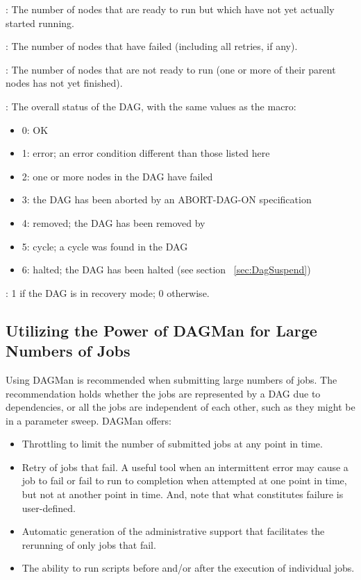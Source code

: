 :  The number of nodes that are ready to run but
which have not yet actually started running.

:  The number of nodes that have failed (including
all retries, if any).

:  The number of nodes that are not ready to run
(one or more of their parent nodes has not yet finished).

:  The overall status of the DAG, with the same values
as the  macro:
\begin{itemize}
\item 0: OK
\item 1: error; an error condition different than those listed here
\item 2: one or more nodes in the DAG have failed
\item 3: the DAG has been aborted by an ABORT-DAG-ON specification
\item 4: removed; the DAG has been removed by 
\item 5: cycle; a cycle was found in the DAG
\item 6: halted; the DAG has been halted (see section ~\ref{sec:DagSuspend})
\end{itemize}

:  1 if the DAG is in recovery mode; 0 otherwise.


\subsection{\label{sec:DAGLotsaJobs}Utilizing the Power of DAGMan for Large Numbers of Jobs}

Using DAGMan is recommended when submitting large numbers of jobs.
The recommendation holds whether the jobs are represented by
a DAG due to dependencies, or all the jobs are
independent of each other, such as they might be in a parameter sweep.
DAGMan offers:
\begin{itemize}
\item{Throttling}
  to limit the number of submitted jobs at any point in time.
\item{Retry of jobs that fail.}
  A useful tool when an intermittent error may cause a job to fail
  or fail to run to completion when attempted at one point in time,
  but not at another point in time.
  And, note that what constitutes failure is user-defined.
\item{Automatic generation of the administrative support that facilitates the
  rerunning of only jobs that fail.}
\item{The ability to run scripts before and/or after the execution of
individual jobs.}
\end{itemize}

